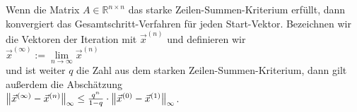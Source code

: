 \begin{Satz}
  Wenn die Matrix  $A \in \mathbb{R}^{n\times n}$  das starke
  Zeilen-Summen-Kriterium erf\"ullt, dann konvergiert das Gesamtschritt-Verfahren f\"ur jeden
  Start-Vektor.  Bezeichnen wir die Vektoren der Iteration mit $\vec{x}^{(n)}$ und definieren wir
  \\[0.2cm]
  \hspace*{1.3cm}
  $\vec{x}^{(\infty)} := \lim\limits_{n\rightarrow\infty} \vec{x}^{(n)}$
  \\[0.2cm] 
  und ist weiter $q$ die Zahl aus dem starken Zeilen-Summen-Kriterium, dann gilt au{\ss}erdem die
  Absch\"atzung 
  \\[0.2cm]
  \hspace*{1.3cm}
  $\big\|\vec{x}^{(\infty)} - \vec{x}^{(n)}\bigr\|_{\infty} \leq \frac{q^n}{1-q} \cdot \big\|\vec{x}^{(0)} - \vec{x}^{(1)}\bigr\|_{\infty}$.
\end{Satz}

